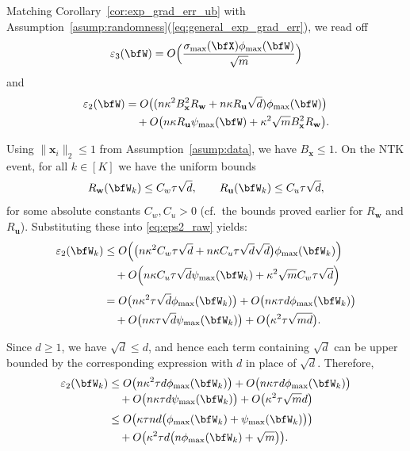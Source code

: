 \documentclass[10pt]{article} %
\theoremstyle{definition}
\theoremstyle{plain}
\def\bfu{{\mathbf{u}}}\def\bfv{{\mathbf{v}}}\def\bfw{{\mathbf{w}}}\def\bfx{{\mathbf{x}}}
\begin{document}
Matching Corollary~\ref{cor:exp_grad_err_ub} with Assumption~\ref{asump:randomness}(\ref{eq:general_exp_grad_err}), we read off
\[
\varepsilon_3(\bfW)
= O\Big(\frac{\sigma_{\max}(\bfX)\phi_{\max}(\bfW)}{\sqrt{m}}\Big)
\]
and
\begin{align}
\varepsilon_2(\bfW)
&=
O\big((n\kappa^2B_{\bfx}^2R_{\bfw} + n\kappa R_{\bfu}\sqrt{d})\phi_{\max}(\bfW)\big)
\nonumber\\
&\quad
+ O\big(n\kappa R_{\bfu}\psi_{\max}(\bfW)+\kappa^2\sqrt{m}B_{\bfx}^2R_{\bfw}\big).
\label{eq:eps2_raw}
\end{align}

Using $\|\bfx_i\|_2\le 1$ from Assumption~\ref{asump:data}, we have
$B_{\bfx}\le 1$.  On the NTK event, for all $k\in[K]$ we have the uniform
bounds
\[
R_{\bfw}(\bfW_k) \le C_w\tau\sqrt{d},
\qquad
R_{\bfu}(\bfW_k) \le C_u\tau\sqrt{d},
\]
for some absolute constants $C_w,C_u>0$ (cf.\ the bounds proved earlier for
$R_{\bfw}$ and $R_{\bfu}$).
Substituting these into \eqref{eq:eps2_raw} yields:
\begin{align}
\varepsilon_2(\bfW_k)
&\le
O\Big(
   \big(n\kappa^2 C_w\tau\sqrt{d}
      + n\kappa C_u\tau\sqrt{d} \sqrt{d}
   \big)\phi_{\max}(\bfW_k)
\Big)
\nonumber\\
&\quad
+ O\Big(
   n\kappa C_u\tau\sqrt{d} \psi_{\max}(\bfW_k)
   + \kappa^2\sqrt{m} C_w\tau\sqrt{d}
\Big)
\nonumber\\[0.3em]
&=
O\big(n\kappa^2\tau\sqrt{d} \phi_{\max}(\bfW_k)\big)
+ O\big(n\kappa\tau d \phi_{\max}(\bfW_k)\big)
\nonumber\\
&\quad
+ O\big(n\kappa\tau\sqrt{d} \psi_{\max}(\bfW_k)\big)
+ O\big(\kappa^2\tau\sqrt{m d}\big).
\label{eq:eps2_subst_sqrt_d}
\end{align}

Since $d\ge 1$, we have $\sqrt{d}\le d$, and hence each term containing
$\sqrt{d}$ can be upper bounded by the corresponding expression with $d$ in
place of $\sqrt{d}$.  Therefore,
\begin{align}
\varepsilon_2(\bfW_k)
&\le
O\big(n\kappa^2\tau d \phi_{\max}(\bfW_k)\big)
+ O\big(n\kappa\tau d \phi_{\max}(\bfW_k)\big)
\nonumber\\[-0.2em]
&\quad
+ O\big(n\kappa\tau d \psi_{\max}(\bfW_k)\big)
+ O\big(\kappa^2\tau\sqrt{m}d\big)
\nonumber\\[0.2em]
&\le
O\big(\kappa\tau n d\big(
      \phi_{\max}(\bfW_k)+\psi_{\max}(\bfW_k)
   \big)\big)
\nonumber\\
&\quad
+ O\big(\kappa^2\tau d\big(
      n \phi_{\max}(\bfW_k)+\sqrt{m}
   \big)\big).
\label{eq:eps2_scaling_pointwise_correct}
\end{align}
\end{document}
